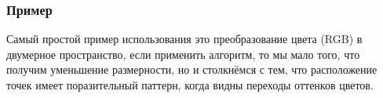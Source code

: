 \subsubsection*{Пример}
Самый простой пример использования это преобразование цвета (RGB) в двумерное пространство, если применить алгоритм, то мы мало того, что получим уменьшение размерности, но и столкнёмся с тем, что расположение точек имеет поразительный паттерн, когда видны переходы оттенков цветов.
